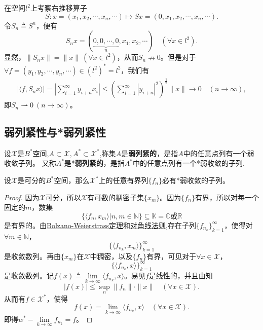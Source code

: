 \documentclass[../../main.tex]{subfiles}%
\begin{document}
\begin{example}[弱收敛而不强收敛]

在空间$l^2$上考察右推移算子
$$S:x=(x_1,x_2,\cdots,x_n,\cdots)\mapsto Sx=(0,x_1,x_2,\cdots,x_n,\cdots).$$
令$S_n\triangleq S^n$，便有
$$S_nx=(\underbrace{0,0,\cdots,0}_{n},x_1,x_2,\cdots)\quad(\forall x\in l^2).$$
显然，$\|S_nx\|=\|x\|\ (\forall x\in l^2)$，从而$S_n\nrightarrow0$。但是对于$\forall f=(y_1,y_2,\cdots,y_n,\cdots)\in(l^2)^*=l^2$，我们有
\begin{align*}
|\langle f,S_nx\rangle|=\left|\sum\limits_{i=1}^{\infty}y_{i+n}x_i\right|\leqslant\left(\sum\limits_{i=1}^{\infty}|y_{i+n}|^2\right)^{\frac{1}{2}}\|x\|\to0\quad(n\to\infty),
\end{align*}
即$S_n\rightharpoonup0\ (n\to\infty)$。
\end{example}

\subsection{弱列紧性与*弱列紧性}

\begin{definition}
设$\mathscr{X}$是$B^*$空间,$A\subset \mathscr{X},A^*\subset \mathscr{X}^*$,称集$A$是\textbf{弱列紧的}，是指$A$中的任意点列有一个弱收敛子列。
又称$A^*$是*\textbf{弱列紧的}，是指$A^*$中的任意点列有一个*弱收敛的子列.
\end{definition}

\begin{theorem}
设$\mathscr{X}$是可分的$B^*$空间，那么$\mathscr{X}^*$上的任意有界列$\{f_n\}$必有*弱收敛的子列。
\end{theorem}
\begin{proof}
因为$\mathscr{X}$可分，所以$\mathscr{X}$有可数的稠密子集$\{x_m\}$。因为$\{f_n\}$有界，所以对每一个固定的$m$，数集
$$\{\langle f_n,x_m\rangle|n,m\in\mathbb{N}\}\subseteq \mathbb{K}=\mathbb{C}\text{或}\mathbb{R}$$
是有界的。由\hyperref[Complex Analysis-theorem:Bolzano-Weierstrass定理]{Bolzano-Weierstrass定理}和\hyperref[proposition:对角线法则]{对角线法则},存在子列$\{f_{n_k}\}_{k=1}^{\infty}$，使得对$\forall m\in\mathbb{N}$，
$$\{\langle f_{n_k},x_m\rangle\}_{k=1}^{\infty}$$
是收敛数列。再由$\{x_m\}$在$\mathscr{X}$中稠密，以及$\{f_n\}$有界，可见对于$\forall x\in\mathscr{X}$，
$$\{\langle f_{n_k},x\rangle\}_{k=1}^{\infty}$$
是收敛数列。记$f(x)\triangleq\lim\limits_{k\to\infty}\langle f_{n_k},x\rangle$。易见$f$是线性的，并且由知
$$|f(x)|\leqslant\sup\limits_{n}\|f_n\|\cdot\|x\|\quad(\forall x\in\mathscr{X}).$$
从而有$f\in\mathscr{X}^*$，使得
$$f(x)=\lim\limits_{k\to\infty}\langle f_{n_k},x\rangle\quad(\forall x\in\mathscr{X}).$$
即得$w^*-\lim\limits_{k\to\infty}f_{n_k}=f$。
\end{proof}
\end{document}

